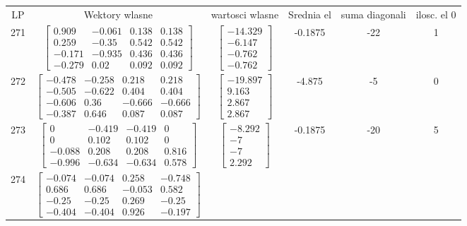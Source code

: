 \documentclass[a4paper,12pt]{article}
\begin{document}
\bgroup {} \vspace{0.2in} \begin{tabular}{c c c c c c}
LP &Wektory wlasne & wartosci wlasne & Srednia el & suma diagonali & ilosc. el 0\\
271
&
$\begin{bmatrix} 0.909 & -0.061 & 0.138 & 0.138 \\ 0.259 & -0.35 & 0.542 & 0.542 \\ -0.171 & -0.935 & 0.436 & 0.436 \\ -0.279 & 0.02 & 0.092 & 0.092 \end{bmatrix}$
&
$\begin{bmatrix} -14.329 \\ -6.147 \\ -0.762 \\ -0.762 \end{bmatrix}$
&
-0.1875
&
-22
&
1
\\
272
&
$\begin{bmatrix} -0.478 & -0.258 & 0.218 & 0.218 \\ -0.505 & -0.622 & 0.404 & 0.404 \\ -0.606 & 0.36 & -0.666 & -0.666 \\ -0.387 & 0.646 & 0.087 & 0.087 \end{bmatrix}$
&
$\begin{bmatrix} -19.897 \\ 9.163 \\ 2.867 \\ 2.867 \end{bmatrix}$
&
-4.875
&
-5
&
0
\\
273
&
$\begin{bmatrix} 0 & -0.419 & -0.419 & 0 \\ 0 & 0.102 & 0.102 & 0 \\ -0.088 & 0.208 & 0.208 & 0.816 \\ -0.996 & -0.634 & -0.634 & 0.578 \end{bmatrix}$
&
$\begin{bmatrix} -8.292 \\ -7 \\ -7 \\ 2.292 \end{bmatrix}$
&
-0.1875
&
-20
&
5
\\
274
&
$\begin{bmatrix} -0.074 & -0.074 & 0.258 & -0.748 \\ 0.686 & 0.686 & -0.053 & 0.582 \\ -0.25 & -0.25 & 0.269 & -0.25 \\ -0.404 & -0.404 & 0.926 & -0.197 \end{bmatrix}$

\end{tabular}
\end{document}
